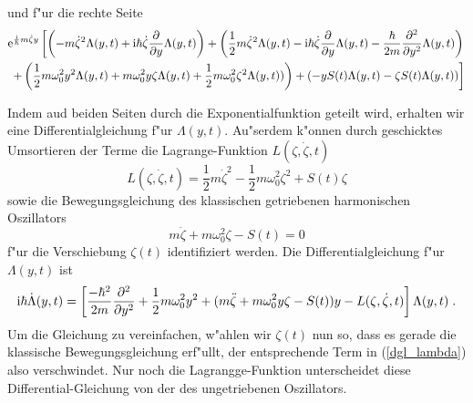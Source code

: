     und f"ur die rechte Seite
    \begin{align}
      \begin{split}
      \text e^{\frac{\text i}{\hbar}m\dot \zeta y} \left[\left(-m\dot \zeta^2 \Lambda(y,t) + \text i \hbar \dot \zeta \frac{\partial}{\partial y} \Lambda(y,t) \right) + \left(\frac{1}{2}m\dot \zeta^2 \Lambda(y,t) - \text{i} \hbar \dot \zeta \frac{\partial}{\partial y} \Lambda(y,t) - \frac{\hbar}{2m}\frac{\partial^2}{\partial y^2} \Lambda(y,t)  \right) \right. \\
      \left. + \left(\frac{1}{2}m\omega_0^2y^2\Lambda(y,t) + m\omega_0^2y\zeta\Lambda(y,t) + \frac{1}{2}m\omega_0^2 \zeta^2\Lambda(y,t)) \right) + \left(-yS(t)\Lambda(y,t) - \zeta S(t)\Lambda(y,t) \right) \right]
    \end{split}
    \end{align}
    \fi

    \newpage

    Indem aud beiden Seiten durch die Exponentialfunktion geteilt wird, erhalten wir eine Differentialgleichung f"ur $\Lambda(y,t)$.
    Au"serdem k"onnen durch geschicktes Umsortieren der Terme die Lagrange-Funktion $L(\zeta,\dot \zeta, t)$
    \begin{equation}
      L(\zeta,\dot \zeta, t) = \frac{1}{2}m\dot \zeta^2 - \frac{1}{2}m\omega_0^2\zeta^2 + S(t)\zeta
      \label{lagrange_zeta}
    \end{equation}
      sowie die Bewegungsgleichung des klassischen getriebenen harmonischen  Oszillators \cite{husimi}
      \begin{equation}
        m\ddot \zeta + m\omega_0^2\zeta - S(t) = 0
        \label{dgl_zeta}
      \end{equation}
    f"ur die Verschiebung $\zeta(t)$ identifiziert werden.
    Die Differentialgleichung f"ur $\Lambda(y,t)$ ist
    \begin{equation}
      \text i \hbar \dot \Lambda(y,t) = \left[ \frac{-\hbar^2}{2m}\frac{\partial^2}{\partial y^2} + \frac{1}{2}m\omega_0^2y^2 + (m\ddot \zeta + m\omega_0^2y\zeta - S(t))y - L(\zeta,\dot \zeta, t) \right]\Lambda(y,t) \; .
      \label{dgl_lambda}
    \end{equation}
    Um die Gleichung zu vereinfachen, w"ahlen wir $\zeta(t)$ nun so, dass es gerade die klassische Bewegungsgleichung erf"ullt, der entsprechende Term in (\ref{dgl_lambda}) also verschwindet.
    Nur noch die Lagrangge-Funktion unterscheidet diese Differential-Gleichung von der des ungetriebenen Oszillators.


